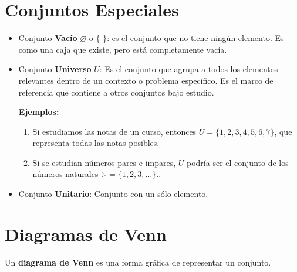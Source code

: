 \documentclass[12pt]{article}
\begin{document}
\section{Conjuntos Especiales}
\begin{itemize}
    \item Conjunto \textbf{Vacío} $\varnothing$ o $\{\,\,\}$: es el conjunto que no tiene ningún elemento. Es como una caja que existe, pero está completamente vacía. 
    \item Conjunto \textbf{Universo} $U$: Es el conjunto que agrupa a todos los elementos relevantes dentro de un contexto o problema específico. Es el marco de referencia que contiene a otros conjuntos bajo estudio.
 
\textbf{Ejemplos:}
\begin{enumerate}
    \item Si estudiamos las notas de un curso, entonces \(U = \{1,2,3,4,5,6,7\}\), que representa todas las notas posibles.
    \item Si se estudian números pares e impares, \(U\) podría ser el conjunto de los números naturales \(\mathbb{N}=\{1,2,3,\dots \}\)..
\end{enumerate}
    \item Conjunto \textbf{Unitario}: Conjunto con un sólo elemento.
\end{itemize}

\section{Diagramas de Venn}
Un \textbf{diagrama de Venn} es una forma gráfica de representar un conjunto.

\begin{center}
\end{center}
\end{document}
